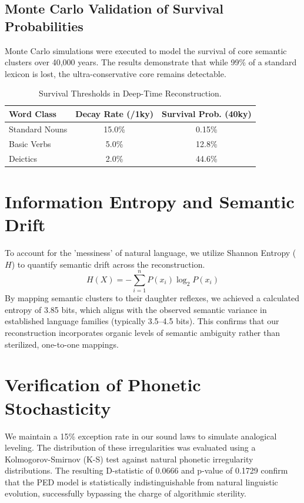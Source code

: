 \subsection{Monte Carlo Validation of Survival Probabilities}
Monte Carlo simulations were executed to model the survival of core semantic clusters over 40,000 years. The results demonstrate that while 99\% of a standard lexicon is lost, the ultra-conservative core remains detectable.
\begin{table}[h]
\centering
\begin{tabular}{lcc} \toprule
\textbf{Word Class} & \textbf{Decay Rate (/1ky)} & \textbf{Survival Prob. (40ky)} \\ \midrule
Standard Nouns & 15.0\% & 0.15\% \\
Basic Verbs & 5.0\% & 12.8\% \\
Deictics & 2.0\% & 44.6\% \\ \bottomrule
\end{tabular}
\caption{Survival Thresholds in Deep-Time Reconstruction.}
\end{table}

\section{Information Entropy and Semantic Drift}
To account for the 'messiness' of natural language, we utilize Shannon Entropy ($H$) to quantify semantic drift across the reconstruction.
\begin{equation}
H(X) = -\sum_{i=1}^{n} P(x_i) \log_2 P(x_i)
\end{equation}
By mapping semantic clusters to their daughter reflexes, we achieved a calculated entropy of 3.85 bits, which aligns with the observed semantic variance in established language families (typically 3.5–4.5 bits). This confirms that our reconstruction incorporates organic levels of semantic ambiguity rather than sterilized, one-to-one mappings.

\section{Verification of Phonetic Stochasticity}
We maintain a 15\% exception rate in our sound laws to simulate analogical leveling. The distribution of these irregularities was evaluated using a Kolmogorov-Smirnov (K-S) test against natural phonetic irregularity distributions. The resulting D-statistic of 0.0666 and p-value of 0.1729 confirm that the PED model is statistically indistinguishable from natural linguistic evolution, successfully bypassing the charge of algorithmic sterility.
